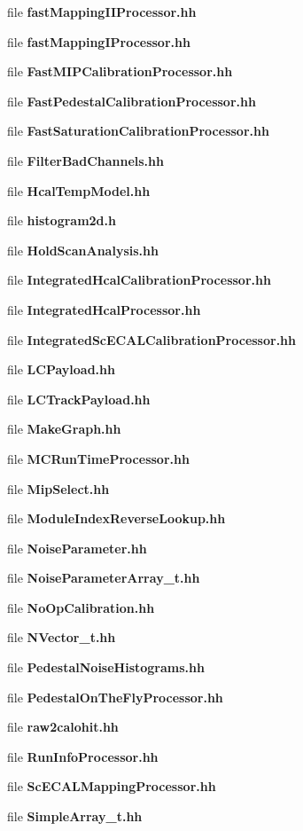 \begin{DoxyCompactItemize}
file {\bfseries fast\-Mapping\-I\-I\-Processor.\-hh}
\item 
file {\bfseries fast\-Mapping\-I\-Processor.\-hh}
\item 
file {\bfseries Fast\-M\-I\-P\-Calibration\-Processor.\-hh}
\item 
file {\bfseries Fast\-Pedestal\-Calibration\-Processor.\-hh}
\item 
file {\bfseries Fast\-Saturation\-Calibration\-Processor.\-hh}
\item 
file {\bfseries Filter\-Bad\-Channels.\-hh}
\item 
file {\bfseries Hcal\-Temp\-Model.\-hh}
\item 
file {\bfseries histogram2d.\-h}
\item 
file {\bfseries Hold\-Scan\-Analysis.\-hh}
\item 
file {\bfseries Integrated\-Hcal\-Calibration\-Processor.\-hh}
\item 
file {\bfseries Integrated\-Hcal\-Processor.\-hh}
\item 
file {\bfseries Integrated\-Sc\-E\-C\-A\-L\-Calibration\-Processor.\-hh}
\item 
file {\bfseries L\-C\-Payload.\-hh}
\item 
file {\bfseries L\-C\-Track\-Payload.\-hh}
\item 
file {\bfseries Make\-Graph.\-hh}
\item 
file {\bfseries M\-C\-Run\-Time\-Processor.\-hh}
\item 
file {\bfseries Mip\-Select.\-hh}
\item 
file {\bfseries Module\-Index\-Reverse\-Lookup.\-hh}
\item 
file {\bfseries Noise\-Parameter.\-hh}
\item 
file {\bfseries Noise\-Parameter\-Array\-\_\-t.\-hh}
\item 
file {\bfseries No\-Op\-Calibration.\-hh}
\item 
file {\bfseries N\-Vector\-\_\-t.\-hh}
\item 
file {\bfseries Pedestal\-Noise\-Histograms.\-hh}
\item 
file {\bfseries Pedestal\-On\-The\-Fly\-Processor.\-hh}
\item 
file {\bfseries raw2calohit.\-hh}
\item 
file {\bfseries Run\-Info\-Processor.\-hh}
\item 
file {\bfseries Sc\-E\-C\-A\-L\-Mapping\-Processor.\-hh}
\item 
file {\bfseries Simple\-Array\-\_\-t.\-hh}

\end{DoxyCompactItemize}
